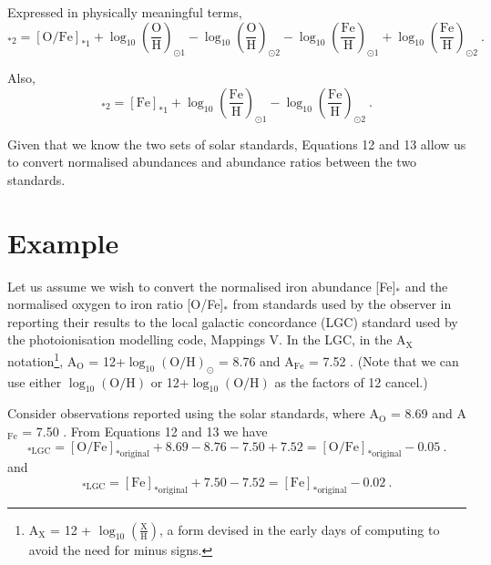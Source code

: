 Expressed in physically meaningful terms,
\begin{equation}
[\text{O}/\text{Fe}]_{*2} = [\text{O}/\text{Fe}]_{*1} + \log_{10}\left(\frac{\text{O}}{\text{H}}\right)_{\odot 1} - \log_{10}\left(\frac{\text{O}}{\text{H}}\right)_{\odot 2} - \log_{10}\left(\frac{\text{Fe}}{\text{H}}\right)_{\odot 1} + \log_{10}\left(\frac{\text{Fe}}{\text{H}}\right)_{\odot 2} \ .
\end{equation}

Also,
\begin{equation}
[\text{Fe}]_{*2} = [\text{Fe}]_{*1} + \log_{10}\left(\frac{\text{Fe}}{\text{H}}\right)_{\odot 1} - \log_{10}\left(\frac{\text{Fe}}{\text{H}}\right)_{\odot 2} \ .
\end{equation}

Given that we know the two sets of solar standards, Equations 12 and 13 allow us to convert normalised abundances and abundance ratios between the two standards.

\section{Example}
Let us assume we wish to convert the normalised iron abundance [Fe]$_*$ and the normalised oxygen to iron ratio [O/Fe]$_*$ from standards used by the observer in reporting their results to the local galactic concordance (LGC) standard used by the photoionisation modelling code, Mappings V.  In the LGC, in the A$_\text{X}$ notation\footnote{ A$_\text{X}$ = 12 + $\log_{10}(\frac{\text{X}}{\text{H}})$, a form devised in the early days of computing to avoid the need for minus signs.}, A$_\text{O}$ = 12+$\log_{10}(\text{O/H})_\odot$ = 8.76 and A$_\text{Fe}$ = 7.52 .  (Note that we can use either $\log_{10}(\text{O/H})$ or 12+$\log_{10}(\text{O/H})$ as the factors of 12 cancel.)

Consider observations reported using the \cite{2009ARA&A..47..481A} solar standards, where A$_\text{O}$ = 8.69 and A$_\text{Fe}$ = 7.50 . From Equations 12 and 13 we have
\begin{equation}
[\text{O}/\text{Fe}]_{*\text{LGC}} = [\text{O}/\text{Fe}]_{*\text{original}} + 8.69 - 8.76 - 7.50 + 7.52 = [\text{O}/\text{Fe}]_{*\text{original}} -0.05 \ .
\end{equation}
and
\begin{equation}
[\text{Fe}]_{*\text{LGC}} = [\text{Fe}]_{*\text{original}} + 7.50 - 7.52 = [\text{Fe}]_{*\text{original}} - 0.02 \ .
\end{equation}

